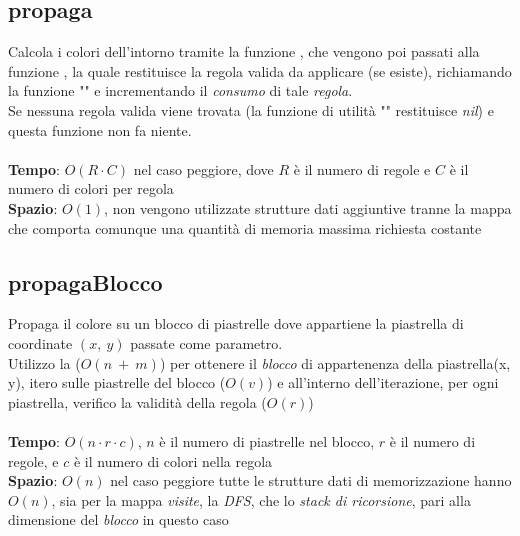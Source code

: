 \documentclass{article}
\begin{document}
\subsection{propaga}\label{sec:prop}
Calcola i colori dell'intorno tramite la funzione , che vengono poi passati alla funzione , la quale restituisce la regola valida da applicare (se esiste), richiamando la funzione "" e incrementando il \textit{consumo} di tale \textit{regola}.\\
Se nessuna regola valida viene trovata (la funzione di utilità "" restituisce \textit{nil}) e questa funzione non fa niente.
\\ \\
\textbf{Tempo}: \(O(R \cdot C)\) nel caso peggiore, dove \(R\) è il numero di regole e \(C\) è il numero di colori per regola\\
\textbf{Spazio}: \(O(1)\), non vengono utilizzate strutture dati aggiuntive tranne la mappa che comporta comunque una quantità di memoria massima richiesta costante

\subsection{propagaBlocco}\label{sec:propBlock}
Propaga il colore su un blocco di piastrelle dove appartiene la piastrella di coordinate \((x,\ y)\) passate come parametro.\\
Utilizzo la  (\(O(n\ +\ m)\)) per ottenere il \textit{blocco} di appartenenza della piastrella(x, y), itero sulle piastrelle del blocco (\(O(v)\)) e all'interno dell'iterazione, per ogni piastrella, verifico la validità della regola (\(O(r)\))\\ \\
\textbf{Tempo}: \(O(n \cdot r \cdot c)\), \(n\) è il numero di piastrelle nel blocco, \(r\) è il numero di regole, e \(c\) è il numero di colori nella regola\\
\textbf{Spazio}: \(O(n)\) nel caso peggiore tutte le strutture dati di memorizzazione hanno \(O(n)\), sia per la mappa \textit{visite}, la \textit{DFS}, che lo \textit{stack di ricorsione}, pari alla dimensione del \textit{blocco} in questo caso
\end{document}
